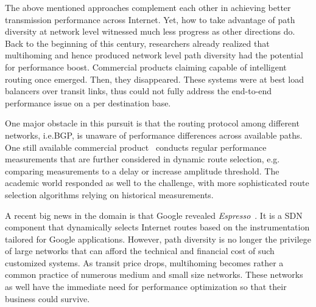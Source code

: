 
The above mentioned approaches complement each other in achieving better transmission performance across Internet.
Yet, how to take advantage of path diversity at network level witnessed much less progress as other directions do.
Back to the beginning of this century, researchers already realized that multihoming and hence produced network level path diversity had the potential for performance boost.
Commercial products claiming capable of intelligent routing once emerged.
Then, they disappeared.
These systems were at best load balancers over transit links, thus could not fully address the end-to-end performance issue on a per destination base.

One major obstacle in this pursuit is that the routing protocol among different networks, i.e.\acf{BGP}, is unaware of performance differences across available paths.
One still available commercial product~\cite{b6} conducts regular performance measurements that are further considered in dynamic route selection, e.g. comparing measurements to a delay or increase amplitude threshold.
The academic world responded as well to the challenge, with more sophisticated route selection algorithms relying on historical measurements. 

A recent big news in the domain is that Google revealed \textit{Espresso}~\cite{espresso}. It is a \ac{SDN} component that dynamically selects Internet routes based on the instrumentation tailored for Google applications.
However, path diversity is no longer the privilege of large networks that can afford the technical and financial cost of such customized systems.
As transit price drops, multihoming becomes rather a common practice of numerous medium and small size networks. 
These networks as well have the immediate need for performance optimization so that their business could survive.

